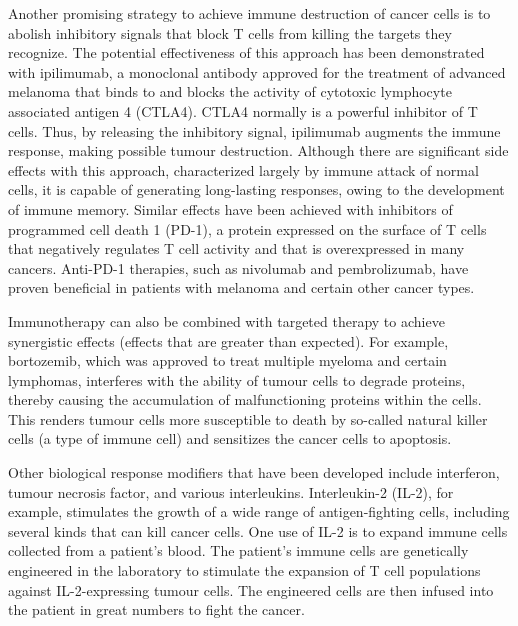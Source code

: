 Another promising strategy to achieve immune destruction of cancer cells is to abolish inhibitory signals that block T cells from killing the targets they recognize. The potential effectiveness of this approach has been demonstrated with ipilimumab, a monoclonal antibody approved for the treatment of advanced melanoma that binds to and blocks the activity of cytotoxic lymphocyte associated antigen 4 (CTLA4). CTLA4 normally is a powerful inhibitor of T cells. Thus, by releasing the inhibitory signal, ipilimumab augments the immune response, making possible tumour destruction. Although there are significant side effects with this approach, characterized largely by immune attack of normal cells, it is capable of generating long-lasting responses, owing to the development of immune memory. Similar effects have been achieved with inhibitors of programmed cell death 1 (PD-1), a protein expressed on the surface of T cells that negatively regulates T cell activity and that is overexpressed in many cancers. Anti-PD-1 therapies, such as nivolumab and pembrolizumab, have proven beneficial in patients with melanoma and certain other cancer types.

Immunotherapy can also be combined with targeted therapy to achieve synergistic effects (effects that are greater than expected). For example, bortozemib, which was approved to treat multiple myeloma and certain lymphomas, interferes with the ability of tumour cells to degrade proteins, thereby causing the accumulation of malfunctioning proteins within the cells. This renders tumour cells more susceptible to death by so-called natural killer cells (a type of immune cell) and sensitizes the cancer cells to apoptosis.

Other biological response modifiers that have been developed include interferon, tumour necrosis factor, and various interleukins. Interleukin-2 (IL-2), for example, stimulates the growth of a wide range of antigen-fighting cells, including several kinds that can kill cancer cells. One use of IL-2 is to expand immune cells collected from a patient’s blood. The patient’s immune cells are genetically engineered in the laboratory to stimulate the expansion of T cell populations against IL-2-expressing tumour cells. The engineered cells are then infused into the patient in great numbers to fight the cancer.
